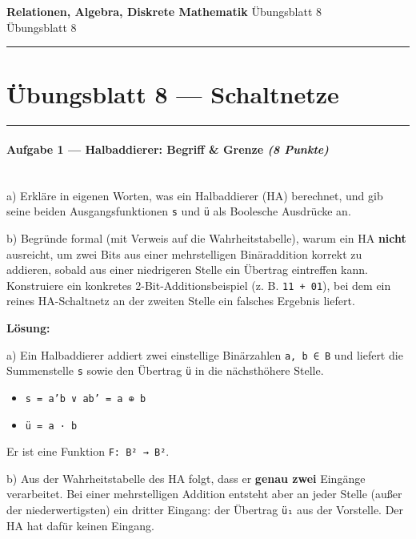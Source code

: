 \documentclass[11pt, a4paper]{article}
\providecommand{\nichttitle}{Übungsblatt}
\providecommand{\nichtsubtitle}{}
\renewcommand{\nichttitle}{Relationen, Algebra, Diskrete Mathematik}
\renewcommand{\nichtsubtitle}{Übungsblatt 8}
\begin{document}
\begin{center}
{\Large\bfseries\color{accent}\nichttitle}
\ifx\nichtsubtitle\empty\else
  \\[2pt]{\normalsize\color{accent!80!black}\nichtsubtitle}
\fi
\\[2pt]
\color{accent}\rule{0.4\linewidth}{0.8pt}\color{black}
\end{center}
\vspace{4pt}


\section{Übungsblatt 8 — Schaltnetze}


\noindent\textcolor{rulegray}{\rule{\linewidth}{0.4pt}}


\paragraph{Aufgabe 1 — Halbaddierer: Begriff \& Grenze \textit{(8 Punkte)}}\mbox{}\\[2pt]

a) Erkläre in eigenen Worten, was ein Halbaddierer (HA) berechnet, und gib seine beiden Ausgangsfunktionen \texttt{s} und \texttt{ü} als Boolesche Ausdrücke an.


b) Begründe formal (mit Verweis auf die Wahrheitstabelle), warum ein HA \textbf{nicht} ausreicht, um zwei Bits aus einer mehrstelligen Binäraddition korrekt zu addieren, sobald aus einer niedrigeren Stelle ein Übertrag eintreffen kann. Konstruiere ein konkretes 2-Bit-Additionsbeispiel (z. B. \texttt{11 + 01}), bei dem ein reines HA-Schaltnetz an der zweiten Stelle ein falsches Ergebnis liefert.


\textbf{Lösung:}


a) Ein Halbaddierer addiert zwei einstellige Binärzahlen \texttt{a, b ∈ B} und liefert die Summenstelle \texttt{s} sowie den Übertrag \texttt{ü} in die nächsthöhere Stelle.


\begin{itemize}
  \item \texttt{s = a'b ∨ ab' = a ⊕ b}
  \item \texttt{ü = a · b}
\end{itemize}

Er ist eine Funktion \texttt{F: B² → B²}.


b) Aus der Wahrheitstabelle des HA folgt, dass er \textbf{genau zwei} Eingänge verarbeitet. Bei einer mehrstelligen Addition entsteht aber an jeder Stelle (außer der niederwertigsten) ein dritter Eingang: der Übertrag \texttt{ü₁} aus der Vorstelle. Der HA hat dafür keinen Eingang.
\end{document}
